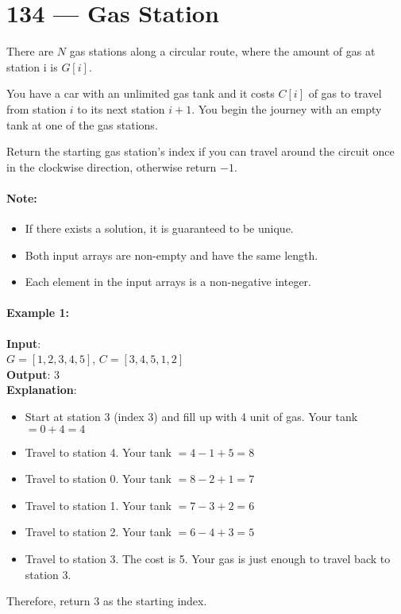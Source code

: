 \section{134 --- Gas Station}
There are $N$ gas stations along a circular route, where the amount of gas at station i is $G[i]$.
\par
You have a car with an unlimited gas tank and it costs $C[i]$ of gas to travel from station $i$ to its next station $i+1$. You begin the journey with an empty tank at one of the gas stations.
\par
Return the starting gas station's index if you can travel around the circuit once in the clockwise direction, otherwise return $-1$.
\paragraph{Note:}
\begin{itemize}
\item If there exists a solution, it is guaranteed to be unique.
\item Both input arrays are non-empty and have the same length.
\item Each element in the input arrays is a non-negative integer.
\end{itemize}
\paragraph{Example 1:}
\begin{flushleft}
\textbf{Input}:
\\
$G  = [1,2,3,4,5]$, $C =[3,4,5,1,2]$
\\
\textbf{Output}: 3
\\
\textbf{Explanation}:
\begin{itemize}
\item Start at station 3 (index 3) and fill up with 4 unit of gas. Your tank $= 0 + 4 = 4$
\item Travel to station 4. Your tank $= 4 - 1 + 5 = 8$
\item Travel to station 0. Your tank $= 8 - 2 + 1 = 7$
\item Travel to station 1. Your tank $= 7 - 3 + 2 = 6$
\item Travel to station 2. Your tank $= 6 - 4 + 3 = 5$
\item Travel to station 3. The cost is 5. Your gas is just enough to travel back to station 3.
\end{itemize}
Therefore, return 3 as the starting index.
\end{flushleft}
